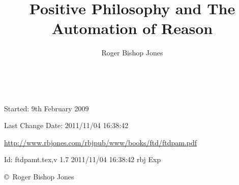 \documentclass[10pt,a4paper.titlepage,openany,twocolumn]{book}
\author{Roger Bishop Jones}
\title{Positive Philosophy and The Automation of Reason}
\date{\ }
\begin{document}
\begin{titlepage}
\maketitle

\vfill

\begin{centering}

{\footnotesize

Started: 9th February 2009

Last Change $ $Date: 2011/11/04 16:38:42 $ $

\href{http://www.rbjones.com/rbjpub/www/books/ftd/ftdpam.pdf}
{http://www.rbjones.com/rbjpub/www/books/ftd/ftdpam.pdf}

$ $Id: ftdpamt.tex,v 1.7 2011/11/04 16:38:42 rbj Exp $ $

\copyright\ Roger Bishop Jones

}%

\end{centering}

\thispagestyle{empty}
\end{titlepage}

\onecolumn

{\parskip=0pt\tableofcontents}

\vfill

\pagebreak

\twocolumn
\end{document}
